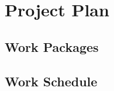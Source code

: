 \documentclass[12pt]{article}
\begin{document}
\section{Project Plan}

    \subsection{Work Packages}

    \subsection{Work Schedule}

\printbibliography

\end{document}

